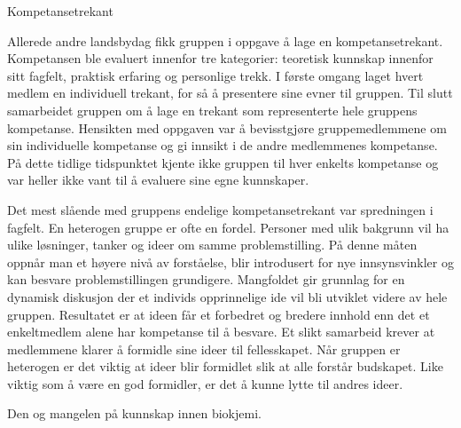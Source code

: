 Kompetansetrekant

Allerede andre landsbydag fikk gruppen i oppgave å lage en kompetansetrekant. Kompetansen ble evaluert innenfor tre kategorier: teoretisk kunnskap innenfor sitt fagfelt, praktisk erfaring og personlige trekk. 
I første omgang laget hvert medlem en individuell trekant, for så å presentere sine evner til gruppen. 
Til slutt samarbeidet gruppen om å lage en trekant som representerte hele gruppens kompetanse.
Hensikten med oppgaven var å bevisstgjøre gruppemedlemmene om sin individuelle kompetanse og gi innsikt i de andre medlemmenes kompetanse. 
På dette tidlige tidspunktet kjente ikke gruppen til hver enkelts kompetanse og var heller ikke vant til å evaluere sine egne kunnskaper.

Det mest slående med gruppens endelige kompetansetrekant var spredningen i fagfelt.
En heterogen gruppe er ofte en fordel.
Personer med ulik bakgrunn vil ha ulike løsninger, tanker og ideer om samme problemstilling. 
På denne måten oppnår man et høyere nivå av forståelse, blir introdusert for nye innsynsvinkler og kan besvare problemstillingen grundigere.
Mangfoldet gir grunnlag for en dynamisk diskusjon der et individs opprinnelige ide vil bli utviklet videre av hele gruppen.
Resultatet er at ideen får et forbedret og bredere innhold enn det et enkeltmedlem alene har kompetanse til å besvare.
Et slikt samarbeid krever at medlemmene klarer å formidle sine ideer til fellesskapet.
Når gruppen er heterogen er det viktig at ideer blir formidlet slik at alle forstår budskapet.
Like viktig som å være en god formidler, er det å kunne lytte til andres ideer. 

Den og mangelen på kunnskap innen biokjemi.